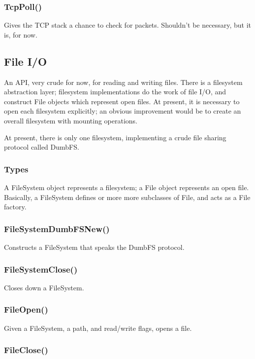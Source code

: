 \documentclass{article}
\begin{document}
\subsubsection{TcpPoll()}

Gives the TCP stack a chance to check for packets.  Shouldn't be
necessary, but it is, for now.

\subsection{File I/O}

An API, very crude for now, for reading and writing files.  There is
a filesystem abstraction layer; filesystem implementations do the work
of file I/O, and construct File objects which represent open files.
At present, it is necessary to open each filesystem explicitly; an
obvious improvement would be to create an overall filesystem with
mounting operations.

At present, there is only one filesystem, implementing a crude file
sharing protocol called DumbFS.

\subsubsection{Types}

A FileSystem object represents a filesystem; a File object represents
an open file.  Basically, a FileSystem defines or more more subclasses
of File, and acts as a File factory.

\subsubsection{FileSystemDumbFSNew()}

Constructs a FileSystem that speaks the DumbFS protocol.

\subsubsection{FileSystemClose()}

Closes down a FileSystem.

\subsubsection{FileOpen()}

Given a FileSystem, a path, and read/write flags, opens a file.

\subsubsection{FileClose()}
\end{document}
